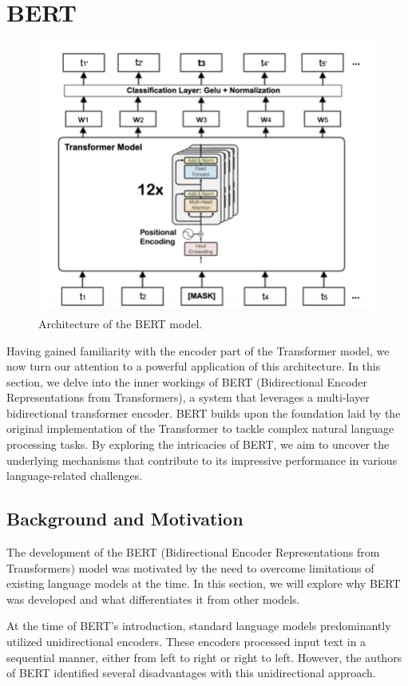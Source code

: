 \documentclass[a4paper,12pt]{report} %
\begin{document}
\section{BERT}
\begin{figure} %
  \centering
  \includegraphics[width=12cm]{img/bert_architecture.png}
  \caption{Architecture of the BERT model.}
  \label{fig:bert_architecture}
\end{figure}
Having gained familiarity with the encoder part of the Transformer model, we now turn our attention to a powerful application of this architecture. In this section, we delve into the inner workings of BERT (Bidirectional Encoder Representations from Transformers), a system that leverages a multi-layer bidirectional transformer encoder. BERT builds upon the foundation laid by the original implementation of the Transformer to tackle complex natural language processing tasks. By exploring the intricacies of BERT, we aim to uncover the underlying mechanisms that contribute to its impressive performance in various language-related challenges.

\subsection{Background and Motivation}
The development of the BERT (Bidirectional Encoder Representations from Transformers) model was motivated by the need to overcome limitations of existing language models at the time. In this section, we will explore why BERT was developed and what differentiates it from other models.

At the time of BERT's introduction, standard language models predominantly utilized unidirectional encoders. These encoders processed input text in a sequential manner, either from left to right or right to left. However, the authors of BERT identified several disadvantages with this unidirectional approach.
\end{document}
